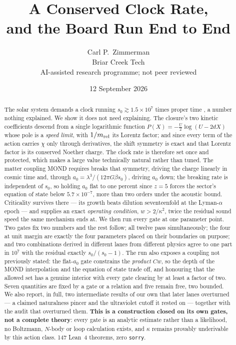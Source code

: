 \documentclass[11pt,letterpaper]{article}
\title{A Conserved Clock Rate,\\ and the Board Run End to End}
\author{Carl P.\ Zimmerman\\ \small Briar Creek Tech\\ \small AI-assisted research programme; not peer reviewed}
\date{12 September 2026}
\begin{document}
\maketitle
\begin{abstract}
The solar system demands a clock running $s_0\gtrsim1.5\times10^7$ times proper time \cite{paper25}, a number nothing explained. We show it does not need explaining. The closure's two kinetic coefficients descend from a single logarithmic function $P(X)=-\tfrac U2\log(U-2dX)$ whose pole is a \emph{speed limit}, with $1/m_{\rm rel}$ its Lorentz factor; and since every term of the action carries $\chi$ only through derivatives, the shift symmetry is exact and that Lorentz factor is its conserved Noether charge. The clock rate is therefore set once and protected, which makes a large value technically natural rather than tuned. The matter coupling MOND requires breaks that symmetry, driving the charge linearly in cosmic time and, through $a_0=\lambda^3/(12\pi G\beta s_0)$, driving $a_0$ down; the breaking rate is independent of $s_0$, so holding $a_0$ flat to one percent since $z=5$ forces the sector's equation of state below $5.7\times10^{-7}$, more than two orders under the acoustic bound. Criticality survives there --- its growth beats dilution seventeenfold at the Lyman-$\alpha$ epoch --- and supplies an exact \emph{operating condition}, $w>2/\kappa^2$, twice the residual sound speed the same mechanism ends at. We then run every gate at one parameter point. Two gates fix two numbers and the rest follow; all twelve pass simultaneously; the four at unit margin are exactly the four parameters placed on their boundaries on purpose; and two combinations derived in different lanes from different physics agree to one part in $10^7$ with the residual exactly $s_0/(s_0-1)$. The run also exposes a coupling not previously stated: the flat-$a_0$ gate constrains the \emph{product} $Cw$, so the depth of the MOND interpolation and the equation of state trade off, and honouring that the allowed set has a genuine interior with every gate clearing by at least a factor of two. Seven quantities are fixed by a gate or a relation and five remain free, two bounded. We also report, in full, two intermediate results of our own that later lanes overturned --- a claimed naturalness pincer and the ultraviolet cutoff it rested on --- together with the audit that overturned them. \textbf{This is a construction closed on its own gates, not a complete theory}: every gate is an analytic estimate rather than a likelihood, no Boltzmann, $N$-body or loop calculation exists, and $\kappa$ remains provably underivable by this action class. 147 Lean~4 theorems, zero \texttt{sorry}.
\end{abstract}
\end{document}
